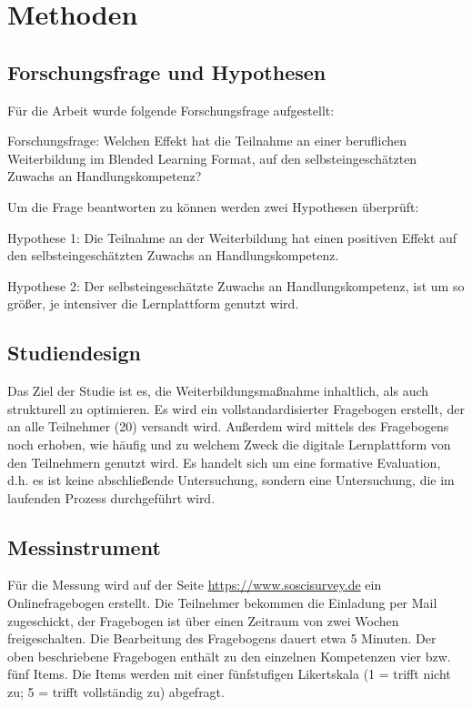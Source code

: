 \documentclass[12pt,smallheadings, bibliography=totoc]{scrartcl}
\begin{document}
\section{Methoden}\label{methoden}

\subsection{Forschungsfrage und
Hypothesen}\label{forschungsfrage-und-hypothesen}

\label{sec:FF} Für die Arbeit wurde folgende Forschungsfrage
aufgestellt:

\begin{framed}
Forschungsfrage: Welchen Effekt hat die Teilnahme an einer beruflichen Weiterbildung im Blended Learning Format, auf den selbsteingeschätzten Zuwachs an Handlungskompetenz?
\end{framed}

Um die Frage beantworten zu können werden zwei Hypothesen überprüft:

\begin{framed}
Hypothese 1: Die Teilnahme an der Weiterbildung hat einen positiven Effekt auf den selbsteingeschätzten Zuwachs an Handlungskompetenz.

 Hypothese 2: Der selbsteingeschätzte Zuwachs an Handlungskompetenz, ist um so größer, je intensiver die Lernplattform genutzt wird.
 \end{framed}

\subsection{Studiendesign}\label{studiendesign}

Das Ziel der Studie ist es, die Weiterbildungsmaßnahme inhaltlich, als
auch strukturell zu optimieren. Es wird ein vollstandardisierter
Fragebogen erstellt, der an alle Teilnehmer (20) versandt wird. Außerdem
wird mittels des Fragebogens noch erhoben, wie häufig und zu welchem
Zweck die digitale Lernplattform von den Teilnehmern genutzt wird. Es
handelt sich um eine formative Evaluation, d.h. es ist keine
abschließende Untersuchung, sondern eine Untersuchung, die im laufenden
Prozess durchgeführt wird.

\subsection{Messinstrument}\label{messinstrument}

Für die Messung wird auf der Seite \url{https://www.soscisurvey.de}
 ein Onlinefragebogen erstellt. Die
Teilnehmer bekommen die Einladung per Mail zugeschickt, der Fragebogen
ist über einen Zeitraum von zwei Wochen freigeschalten. Die Bearbeitung
des Fragebogens dauert etwa 5 Minuten. Der oben beschriebene Fragebogen
enthält zu den einzelnen Kompetenzen vier bzw. fünf Items. Die Items
werden mit einer fünfstufigen Likertskala (1 = trifft nicht zu; 5 =
trifft vollständig zu) abgefragt.
\end{document}
